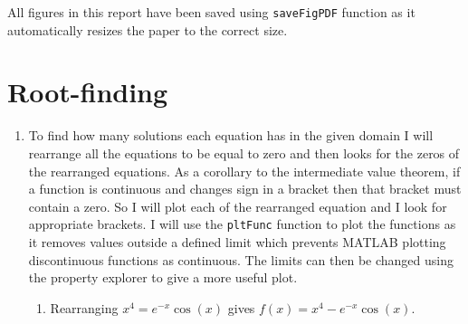 \documentclass[a4paper,11pt]{article}
\begin{document}

\tableofcontents

\hfill \break

All figures in this report have been saved using \verb*|saveFigPDF| function 
as it automatically resizes the paper to the correct size.


\section{Root-finding}
\begin{enumerate}
	\item To find how many solutions each equation has in the given domain I 
	will rearrange all the equations to be equal to zero and then looks for 
	the zeros of the rearranged equations. As a corollary to the intermediate 
	value theorem, if a function is continuous and changes sign in a bracket 
	then that bracket must contain a zero. So I will plot each of the 
	rearranged equation and I look for appropriate brackets. I will use the 
	\verb*|pltFunc| function to plot the functions as it removes values 
	outside a defined limit which prevents MATLAB plotting discontinuous 
	functions as continuous. The limits can then be changed using the 
	property explorer to give a more useful plot.
	
	\begin{enumerate}
		\item Rearranging $x^{4} = e^{-x} \cos(x)$ gives $f(x) = x^{4} - 
		e^{-x} \cos(x)$.
		
\end{enumerate}
\end{enumerate}
\end{document}
